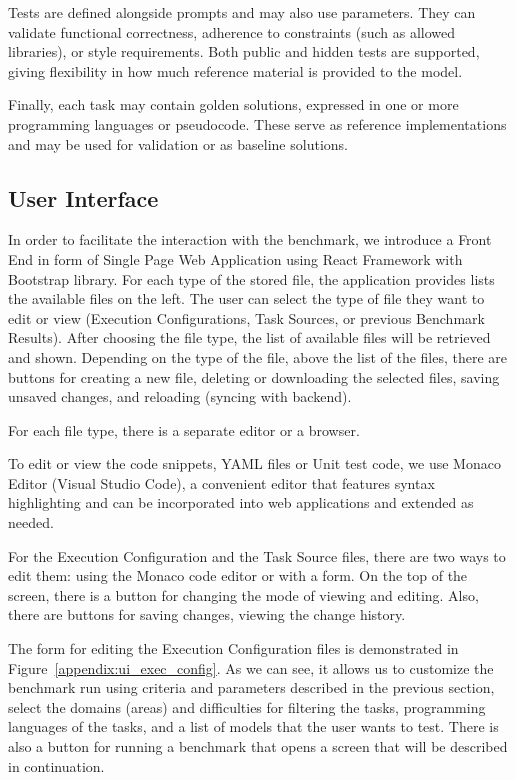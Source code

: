 Tests are defined alongside prompts and may also use parameters.
They can validate functional correctness, adherence to constraints (such as allowed libraries), or style requirements.
Both public and hidden tests are supported, giving flexibility in how much reference material is provided to the model.

Finally, each task may contain golden solutions, expressed in one or more programming languages or pseudocode.
These serve as reference implementations and may be used for validation or as baseline solutions.

\subsection{User Interface}

In order to facilitate the interaction with the benchmark, we introduce a Front End in form of Single Page Web Application using React Framework with Bootstrap library.
For each type of the stored file, the application provides lists the available files on the left.
The user can select the type of file they want to edit or view (Execution Configurations, Task Sources, or previous Benchmark Results).
After choosing the file type, the list of available files will be retrieved and shown.
Depending on the type of the file, above the list of the files, there are buttons for creating a new file, deleting or downloading the selected files, saving unsaved changes, and reloading (syncing with backend).

For each file type, there is a separate editor or a browser.

To edit or view the code snippets, YAML files or Unit test code, we use Monaco Editor (Visual Studio Code),
a convenient editor that features syntax highlighting and can be incorporated into web applications and extended as needed.

For the Execution Configuration and the Task Source files, there are two ways to edit them: using the Monaco code editor or with a form.
On the top of the screen, there is a button for changing the mode of viewing and editing. Also, there are buttons for saving changes, viewing the change history.

The form for editing the Execution Configuration files is demonstrated in Figure~\ref{appendix:ui_exec_config}.
As we can see, it allows us to customize the benchmark run using criteria and parameters described in the previous section, select the domains (areas) and difficulties for filtering the tasks, programming languages of the tasks, and a list of models that the user wants to test.
There is also a button for running a benchmark that opens a screen that will be described in continuation.

